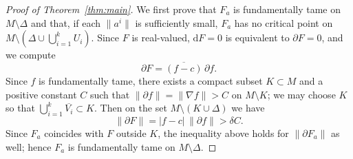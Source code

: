 \documentclass[11pt]{amsart}
\theoremstyle{plain}
\theoremstyle{definition}
\theoremstyle{remark}
\numberwithin{equation}{section}
\begin{document}
\begin{proof}[Proof of Theorem~\ref{thm:main}]
    We first prove that $F_a$ is fundamentally tame on $M \setminus \Delta$ and that, if each $\|a^i\|$ is sufficiently small, $F_a$ has no critical point on $M \setminus (\Delta \cup \bigcup_{i=1}^{k} U_i)$.
    Since $F$ is real-valued, $\mathrm{d}F = 0$ is equivalent to $\partial F = 0$, and we compute
    \begin{equation}
        \partial F = \overline{(f-c)}\,\partial f.
    \end{equation}
    Since $f$ is fundamentally tame, there exists a compact subset $K \subset M$ and a positive constant $C$ such that $\|\partial f\| = \|\nabla f\| > C$ on $M \setminus K$; we may choose $K$ so that $\bigcup_{i=1}^{k} \overline{V_i} \subset K$.
    Then on the set $M \setminus (K \cup \Delta)$ we have
    \begin{equation}
        \|\partial F\| = |f-c|\,\|\partial f\| > \delta C.
    \end{equation}
    Since $F_a$ coincides with $F$ outside $K$, the inequality above holds for $\|\partial F_a\|$ as well; hence $F_a$ is fundamentally tame on $M \setminus \Delta$.


\end{proof}
\end{document}
